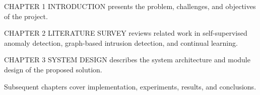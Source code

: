 \vspace{0.6em}
CHAPTER 1 INTRODUCTION presents the problem, challenges, and objectives of the
project.

\vspace{0.6em}
CHAPTER 2 LITERATURE SURVEY reviews related work in self-supervised anomaly
detection, graph-based intrusion detection, and continual learning.

\vspace{0.6em}
CHAPTER 3 SYSTEM DESIGN describes the system architecture and module design of
the proposed solution.

\vspace{0.6em}
Subsequent chapters cover implementation, experiments, results, and conclusions.
